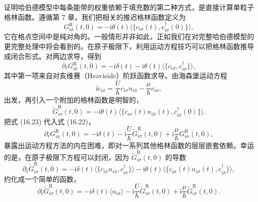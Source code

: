 证明哈伯德模型中每条能带的权重依赖于填充数的第二种方式，是直接计算单粒子格林函数。遵循第 7 章，我们把相关的推迟格林函数定义为
\begin{equation*}
G^{\mathrm{R}}_{i\sigma}(t,0)=-\mathrm{i}\theta(t)\langle\{c_{i\sigma}(t),c^{\dagger}_{i\sigma}(0)\}\rangle,\tag{16.21}
\end{equation*}
它在格点空间中是纯对角的。一般情形并非如此，正如我们在对完整哈伯德模型的更完整处理中将会看到的。在原子极限下，利用运动方程技巧可以把格林函数推导成闭合形式。对两边求导，得到
\begin{equation*}
\partial_{t}G^{\mathrm{R}}_{i\sigma}(t,0)=-\mathrm{i}\delta(t)-\mathrm{i}\theta(t)\langle\{\dot{c}_{i\sigma},c^{\dagger}_{i\sigma}\}\rangle,\tag{16.22}
\end{equation*}
其中第一项来自对亥维赛（Heaviside）阶跃函数求导。由海森堡运动方程
\begin{equation*}
\mathrm{i}\dot{c}_{i\sigma}=\frac{U}{\hbar}c_{i\sigma}n_{i\bar{\sigma}}-\frac{\mu}{\hbar}c_{i\sigma},\tag{16.23}
\end{equation*}
出发，再引入一个附加的格林函数是明智的，
\begin{equation*}
\tilde{G}^{\mathrm{R}}_{i\sigma}(t,0)=-\mathrm{i}\theta(t)\langle\{c_{i\sigma}(t)n_{i\bar{\sigma}}(t),c^{\dagger}_{i\sigma}(0)\}\rangle.\tag{16.24}
\end{equation*}
把式 (16.23) 代入式 (16.22)，
\begin{equation*}
\partial_{t}G^{\mathrm{R}}_{i\sigma}(t,0)=-\mathrm{i}\delta(t)-\mathrm{i}\frac{U}{\hbar}\tilde{G}^{\mathrm{R}}_{i\sigma}(t,0)+\mathrm{i}\frac{\mu}{\hbar}G^{\mathrm{R}}_{i\sigma}(t,0),\tag{16.25}
\end{equation*}
暴露出运动方程方法的内在困难，即对一系列其他格林函数的层层嵌套依赖。幸运的是，在原子极限下方程可以封闭，因为 $\tilde{G}^{\mathrm{R}}_{i\sigma}(t,0)$ 的导数
\begin{equation*}
\partial_{t}\tilde{G}^{\mathrm{R}}_{i\sigma}(t,0)=-\mathrm{i}\delta(t)\langle\{c_{i\sigma}n_{i\bar{\sigma}},c^{\dagger}_{i\sigma}\}\rangle-\mathrm{i}\theta(t)\langle\{\dot{c}_{i\sigma}(t)n_{i\bar{\sigma}}(t),c^{\dagger}_{i\sigma}\}\rangle,\tag{16.26}
\end{equation*}
约化成一个简单的函数，
\begin{equation*}
\partial_{t}\tilde{G}^{\mathrm{R}}_{i\sigma}(t,0)=-\mathrm{i}\delta(t)\langle n_{i\bar{\sigma}}\rangle-\mathrm{i}\frac{U}{\hbar}\tilde{G}^{\mathrm{R}}_{i\sigma}(t,0)+\mathrm{i}\frac{\mu}{\hbar}\tilde{G}^{\mathrm{R}}_{i\sigma}(t,0).\tag{16.27}
\end{equation*}
